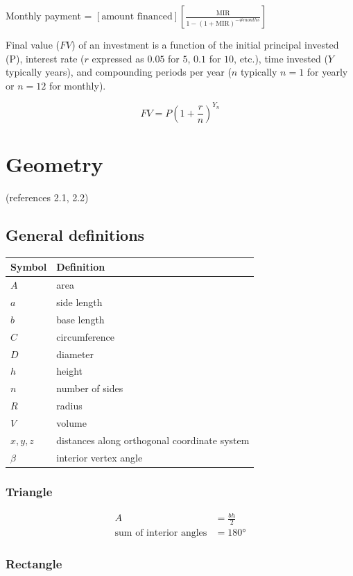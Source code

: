 \documentclass[
]{book}
\begin{document}
Monthly payment = \(\left[ \text{amount financed} \right] \left[ \frac{\mathrm{MIR}}{1 - \left( 1 + \mathrm{MIR} \right)^{-\#months}} \right]\)

Final value (\(FV\)) of an investment is a function of the initial principal invested (P), interest rate (\(r\) expressed as \(0.05\) for \(5%
\), \(0.1\) for \(10%
\), etc.), time invested (\(Y\) typically years), and compounding periods per year (\(n\) typically \(n = 1\) for yearly or \(n = 12\) for monthly).

\[FV   =   P (1  +  \frac{r}{n})^{Y_n}\]

\hypertarget{geometry}{%
\section{Geometry}\label{geometry}}

(references 2.1, 2.2)

\hypertarget{general-definitions}{%
\subsection*{General definitions}\label{general-definitions}}

\begin{longtable}[]{@{}ll@{}}
\toprule
Symbol & Definition\tabularnewline
\midrule
\endhead
\(A\) & area\tabularnewline
\(a\) & side length\tabularnewline
\(b\) & base length\tabularnewline
\(C\) & circumference\tabularnewline
\(D\) & diameter\tabularnewline
\(h\) & height\tabularnewline
\(n\) & number of sides\tabularnewline
\(R\) & radius\tabularnewline
\(V\) & volume\tabularnewline
\(x, y, z\) & distances along orthogonal coordinate system\tabularnewline
\(\beta\) & interior vertex angle\tabularnewline
\bottomrule
\end{longtable}

\hypertarget{triangle}{%
\subsubsection*{Triangle}\label{triangle}}

\begin{align}
A &= \frac{bh}{2}\\
\text{sum of interior angles} &= 180°
\end{align}

\hypertarget{rectangle}{%
\subsubsection*{Rectangle}\label{rectangle}}
\end{document}
